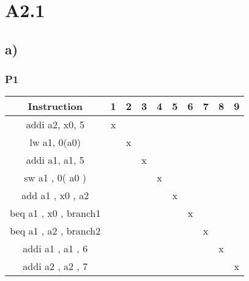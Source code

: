 \section*{A2.1}

\subsection*{\textbf{a)}}

\subsubsection*{P1}
\begin{center}
    \begin{tabular}{c | c | c | c | c | c | c | c | c | c }
        \textbf{Instruction} & \textbf{1} & \textbf{2} & \textbf{3} & \textbf{4} & \textbf{5} & \textbf{6} & \textbf{7} & \textbf{8} & \textbf{9} \\
        \hline
        addi a2, x0, 5 & x & & & & & & & \\
        lw a1, 0(a0) & & x & & & & & & & \\
        addi a1, a1, 5 & & & x & & & & &  \\
        sw a1 , 0( a0 ) & & & & x & & & & & \\
        add a1 , x0 , a2 & & & & & x & & & & \\
        beq a1 , x0 , branch1   & & & & & & x & & &  \\
        beq a1 , a2 , branch2 & & & & &   &   & x &  \\
        addi a1 , a1 , 6 & & & & &   &   &   & x  \\
        addi a2 , a2 , 7 & & & & & & & & & x   \\
    \end{tabular}
\end{center}


